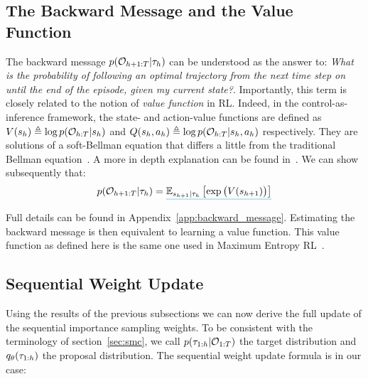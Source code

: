 \subsection{The Backward Message and the Value Function}
The backward message $p({\mathcal{O}}_{h+1:T}| \tau_h)$ can be understood as the answer to: \textit{What is the probability of following an optimal trajectory from the next time step on until the end of the episode, given my current state?}. %
Importantly, this term is closely related to the notion of \textit{value function} in RL. Indeed, in the control-as-inference framework, the  state- and action-value functions are defined as $V(s_h) \triangleq \log p({\mathcal{O}}_{h:T}|s_h)$ and $Q(s_h, a_h) \triangleq \log p({\mathcal{O}}_{h:T}|s_h, a_h)$ respectively. They are solutions of a soft-Bellman equation that differs a little from the traditional Bellman equation~\citep{o2016combining, nachum2017bridging, schulman2017equivalence, abdolmaleki2018maximum}. 
A more in depth explanation can be found in~\citep{levine2018reinforcement}. We can show subsequently that: %
\begin{align}
p(\gO_{h+1:T}|\traj_{h}) =\mathunderline{beta}{ \E_{s_{h+1} | \traj_h }\left[\exp\big(V(s_{h+1})\big)\right]}
\end{align}

\noindent Full details can be found in Appendix~\ref{app:backward_message}. Estimating the backward message is then equivalent to learning a value function.  
This value function as defined here is the same one used in Maximum Entropy RL~\citep{ziebart2010modeling}.


\subsection{Sequential Weight Update}
Using the results of the previous subsections we can now derive the full update of the sequential importance sampling weights. To be consistent with the terminology of section~\ref{sec:smc}, we call $p(\tau_{1:h} | {\mathcal{O}}_{1:T})$ the target distribution and $q_\theta(\tau_{1:h})$ the proposal distribution. The sequential weight update formula is in our case:

